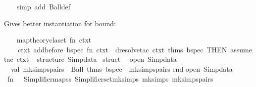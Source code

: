 \begin{isabellebody}
%
\isadelimproof
\ \ %
\endisadelimproof
%
\isatagproof
{}\isamarkupfalse%
\ {\isacharparenleft}{\kern0pt}simp\ add{\isacharcolon}{\kern0pt}\ Ball{\isacharunderscore}{\kern0pt}def{\isacharparenright}{\kern0pt}%
\endisatagproof
{\isafoldproof}%
%
\isadelimproof
%
\endisadelimproof
%
\begin{isamarkuptext}%
Gives better instantiation for bound:%
\end{isamarkuptext}\isamarkuptrue%
%
\isadelimML
%
\endisadelimML
%
\isatagML
{}\isamarkupfalse%
\ {\isacartoucheopen}\isanewline
\ \ map{\isacharunderscore}{\kern0pt}theory{\isacharunderscore}{\kern0pt}claset\ {\isacharparenleft}{\kern0pt}fn\ ctxt\ {\isacharequal}{\kern0pt}{\isachargreater}{\kern0pt}\isanewline
\ \ \ \ ctxt\ addbefore\ {\isacharparenleft}{\kern0pt}{\isachardoublequote}{\kern0pt}bspec{\isachardoublequote}{\kern0pt}{\isacharcomma}{\kern0pt}\ fn\ ctxt{\isacharprime}{\kern0pt}\ {\isacharequal}{\kern0pt}{\isachargreater}{\kern0pt}\ dresolve{\isacharunderscore}{\kern0pt}tac\ ctxt{\isacharprime}{\kern0pt}\ {\isacharat}{\kern0pt}{\isacharbraceleft}{\kern0pt}thms\ bspec{\isacharbraceright}{\kern0pt}\ THEN{\isacharprime}{\kern0pt}\ assume{\isacharunderscore}{\kern0pt}tac\ ctxt{\isacharprime}{\kern0pt}{\isacharparenright}{\kern0pt}{\isacharparenright}{\kern0pt}\isanewline
{\isacartoucheclose}\isanewline
\isanewline
{}\isamarkupfalse%
\ {\isacartoucheopen}\isanewline
structure\ Simpdata\ {\isacharequal}{\kern0pt}\isanewline
struct\isanewline
\ \ open\ Simpdata{\isacharsemicolon}{\kern0pt}\isanewline
\ \ val\ mksimps{\isacharunderscore}{\kern0pt}pairs\ {\isacharequal}{\kern0pt}\ {\isacharbrackleft}{\kern0pt}{\isacharparenleft}{\kern0pt}\isactrlconstUNDERSCOREname {\isasymopen}Ball{\isasymclose}{\isacharcomma}{\kern0pt}\ {\isacharat}{\kern0pt}{\isacharbraceleft}{\kern0pt}thms\ bspec{\isacharbraceright}{\kern0pt}{\isacharparenright}{\kern0pt}{\isacharbrackright}{\kern0pt}\ {\isacharat}{\kern0pt}\ mksimps{\isacharunderscore}{\kern0pt}pairs{\isacharsemicolon}{\kern0pt}\isanewline
end{\isacharsemicolon}{\kern0pt}\isanewline
\isanewline
open\ Simpdata{\isacharsemicolon}{\kern0pt}\isanewline
{\isacartoucheclose}\isanewline
\isanewline
{}\isamarkupfalse%
\ {\isacartoucheopen}fn\ {\isacharunderscore}{\kern0pt}\ {\isacharequal}{\kern0pt}{\isachargreater}{\kern0pt}\ Simplifier{\isachardot}{\kern0pt}map{\isacharunderscore}{\kern0pt}ss\ {\isacharparenleft}{\kern0pt}Simplifier{\isachardot}{\kern0pt}set{\isacharunderscore}{\kern0pt}mksimps\ {\isacharparenleft}{\kern0pt}mksimps\ mksimps{\isacharunderscore}{\kern0pt}pairs{\isacharparenright}{\kern0pt}{\isacharparenright}{\kern0pt}{\isacartoucheclose}%

\end{isabellebody}
